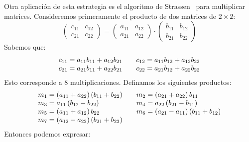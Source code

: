   \begin{example}
    Otra aplicación de esta estrategia es el algoritmo de Strassen~%
      \cite{strassen69:_matrix_multiplication}
    para multiplicar matrices.
    Consideremos primeramente el producto de
    dos matrices de \(2 \times 2\):
    \begin{equation*}
      \begin{pmatrix}
        c_{1 1} & c_{1 2} \\
        c_{2 1} & c_{2 2}
      \end{pmatrix}
        = \begin{pmatrix}
            a_{1 1} & a_{1 2} \\
            a_{2 1} & a_{2 2}
          \end{pmatrix}
            \cdot
              \begin{pmatrix}
                b_{1 1} & b_{1 2} \\
                b_{2 1} & b_{2 2}
              \end{pmatrix}
    \end{equation*}
    Sabemos que:
    \begin{equation*}
      \begin{array}{l@{\qquad}l}
        c_{1 1}
          = a_{1 1} b_{1 1} + a_{1 2} b_{2 1} &
        c_{1 2}
          = a_{1 1} b_{1 2} + a_{1 2} b_{2 2} \\
        c_{2 1}
          = a_{2 1} b_{1 1} + a_{2 2} b_{2 1} &
        c_{2 2}
          = a_{2 1} b_{1 2} + a_{2 2} b_{2 2}
      \end{array}
    \end{equation*}
    Esto corresponde a \num{8} multiplicaciones.
    Definamos los siguientes productos:
    \begin{equation*}
      \begin{array}{l@{\qquad}l}
        m_1
          = (a_{1 1} + a_{2 2}) \, (b_{1 1} + b_{2 2}) &
        m_2
          = (a_{2 1} + a_{2 2}) \, b_{1 1} \\
        m_3
          = a_{1 1} \, (b_{1 2} - b_{2 2}) &
        m_4
          = a_{2 2} \, (b_{2 1} - b_{1 1}) \\
        m_5
          = (a_{1 1} + a_{1 2}) \, b_{2 2} &
        m_6
          = (a_{2 1} - a_{1 1}) \, (b_{1 1} + b_{1 2}) \\
        m_7
          = (a_{1 2} - a_{2 2}) \, (b_{2 1} + b_{2 2})
      \end{array}
    \end{equation*}
    Entonces podemos expresar:

\end{example}
